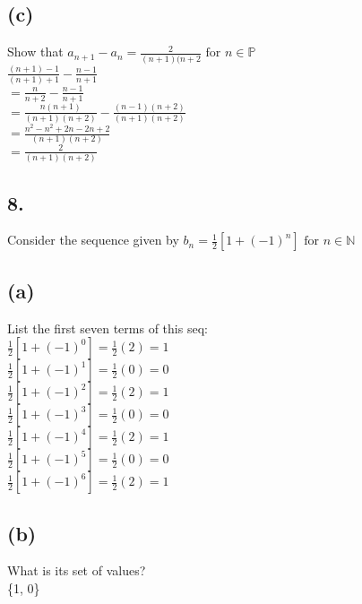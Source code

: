 \documentclass[11pt]{article}
\begin{document}
\subsection*{(c)}
\begin{center}
Show that $a_{n+1}-a_{n}  = \frac{2}{(n+1)(n+2} \text{ for } n \in \mathbb{P}$\\
\hfill \break
$\frac{(n+1)-1}{(n+1)+1} - \frac{n-1}{n+1}$\\
$=\frac{n}{n+2} - \frac{n-1}{n+1}$\\
$=\frac{n(n+1)}{(n+1)(n+2)} - \frac{(n-1)(n+2)}{(n+1)(n+2)}$\\
$=\frac{n^{2}-n^{2}+2n-2n+2}{(n+1)(n+2)}$\\
$=\frac{2}{(n+1)(n+2)}$\\
\end{center}
%
%
\subsection*{8.}
\begin{center}
Consider the sequence given by $b_{n} = \frac{1}{2} [1 + (-1)^{n}] \text{ for } n \in \mathbb{N}$
\end{center}

\subsection*{(a)}
\begin{center}
List the first seven terms of this seq:\\
\hfill \break
$\frac{1}{2} [1 + (-1)^{0}] = \frac{1}{2} (2) = 1$\\
$\frac{1}{2} [1 + (-1)^{1}] = \frac{1}{2} (0) = 0$\\
$\frac{1}{2} [1 + (-1)^{2}] = \frac{1}{2} (2) = 1$\\
$\frac{1}{2} [1 + (-1)^{3}] = \frac{1}{2} (0) = 0$\\
$\frac{1}{2} [1 + (-1)^{4}] = \frac{1}{2} (2) = 1$\\
$\frac{1}{2} [1 + (-1)^{5}] = \frac{1}{2} (0) = 0$\\
$\frac{1}{2} [1 + (-1)^{6}] = \frac{1}{2} (2) = 1$\\
\end{center}

\subsection*{(b)}
\begin{center}
What is its set of values?\\
\hfill \break
\{1, 0\}
\end{center}
%
%
\end{document}
